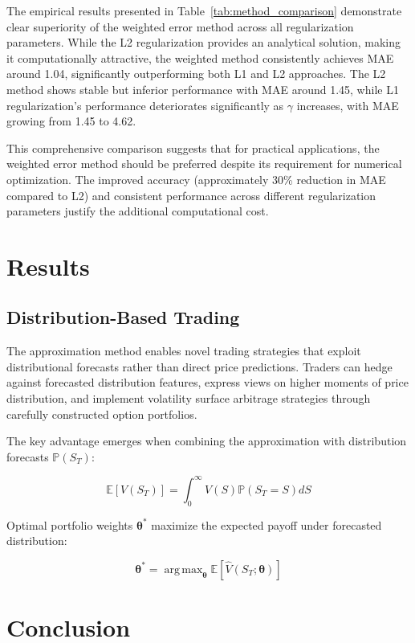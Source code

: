 \documentclass[12pt]{article}
\DeclareMathOperator*{\argmax}{arg\,max}
\begin{document}


The empirical results presented in Table~\ref{tab:method_comparison} demonstrate clear 
superiority of the weighted error method across all regularization parameters. While the 
L2 regularization provides an analytical solution, making it computationally attractive, 
the weighted method consistently achieves MAE around 1.04, significantly outperforming 
both L1 and L2 approaches. The L2 method shows stable but inferior performance with MAE 
around 1.45, while L1 regularization's performance deteriorates significantly as $\gamma$ 
increases, with MAE growing from 1.45 to 4.62.

This comprehensive comparison suggests that for practical applications, the weighted error 
method should be preferred despite its requirement for numerical optimization. The improved 
accuracy (approximately 30\% reduction in MAE compared to L2) and consistent performance 
across different regularization parameters justify the additional computational cost.

\section{Results}
\subsection{Distribution-Based Trading}
The approximation method enables novel trading strategies that exploit distributional 
forecasts rather than direct price predictions. Traders can hedge against forecasted 
distribution features, express views on higher moments of price distribution, and 
implement volatility surface arbitrage strategies through carefully constructed 
option portfolios.

The key advantage emerges when combining the approximation with distribution 
forecasts $\mathbb{P}(S_T)$:
 
\begin{equation}
\mathbb{E}[V(S_T)] = 
    \int_{0}^{\infty} 
        V(S) \mathbb{P}(S_T = S) dS
\end{equation}

Optimal portfolio weights $\boldsymbol{\theta}^*$ maximize the expected payoff under 
forecasted distribution:

\begin{equation}
\boldsymbol{\theta}^* = 
    \argmax_{\boldsymbol{\theta}} 
        \mathbb{E}\left[\hat{V}(S_T;\boldsymbol{\theta})\right]
\end{equation}

\section{Conclusion}



\end{document}
